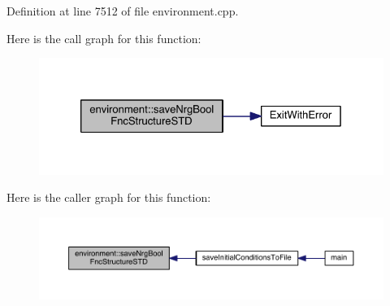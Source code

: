 Definition at line 7512 of file environment.\-cpp.



Here is the call graph for this function\-:\nopagebreak
\begin{figure}[H]
\begin{center}
\leavevmode
\includegraphics[width=326pt]{a00014_a1412b9b1c3bd3e42bcb481f5e18ea931_cgraph}
\end{center}
\end{figure}




Here is the caller graph for this function\-:\nopagebreak
\begin{figure}[H]
\begin{center}
\leavevmode
\includegraphics[width=350pt]{a00014_a1412b9b1c3bd3e42bcb481f5e18ea931_icgraph}
\end{center}
\end{figure}


